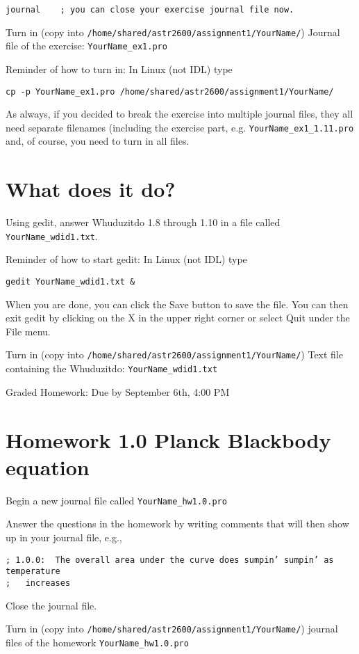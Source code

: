 \documentclass{article}
\newcommand{\hmwkDueDate}{September 6th, 4:00 PM}
\begin{document}
\begin{spacing}{1.0}
\verb|journal    ; you can close your exercise journal file now.  |





Turn in (copy into \verb|/home/shared/astr2600/assignment1/YourName/|)
Journal file of the exercise: \verb|YourName_ex1.pro|

Reminder of how to turn in: In Linux (not IDL) type

\verb|cp -p YourName_ex1.pro /home/shared/astr2600/assignment1/YourName/|

As always, if you decided to break the exercise into multiple journal files, they all need separate filenames (including the exercise part, e.g. \verb|YourName_ex1_1.11.pro| and, of course, you need to turn in all files.



\vspace{-5mm}
\section{What does it do?}

Using gedit, answer Whuduzitdo 1.8 through 1.10 in a file called \verb|YourName_wdid1.txt|.

Reminder of how to start gedit: In Linux (not IDL) type

\verb|gedit YourName_wdid1.txt &|

When you are done, you can click the Save button to save the file.  You can then exit gedit by clicking on the X in the upper right corner or select Quit under the File menu.

Turn in (copy into \verb|/home/shared/astr2600/assignment1/YourName/|)
Text file containing the Whuduzitdo: \verb|YourName_wdid1.txt|

Graded Homework:  Due by \hmwkDueDate

\vspace{-5mm}
\section{Homework 1.0  Planck Blackbody equation}
Begin a new journal file called \verb|YourName_hw1.0.pro|

Answer the questions in the homework by writing comments that will then show up in your journal file, e.g.,

\begin{verbatim}
; 1.0.0:  The overall area under the curve does sumpin’ sumpin’ as temperature
;   increases
\end{verbatim}

Close the journal file.  


Turn in (copy into \verb|/home/shared/astr2600/assignment1/YourName/|)
journal files of the homework
\verb|YourName_hw1.0.pro|



\end{spacing}
\end{document}
